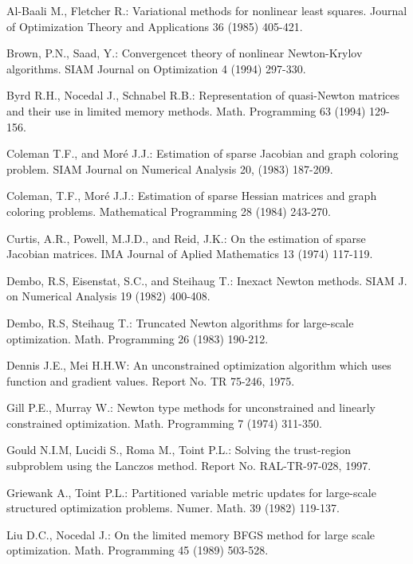 \documentclass{esub2acm}
\begin{document}
\small
\begin{thebibliography}{99}

Al-Baali M., Fletcher R.: Variational methods for nonlinear least
squares. Journal of Optimization Theory and Applications 36 (1985)
405-421.

Brown, P.N., Saad, Y.: Convergencet theory of nonlinear Newton-Krylov
algorithms. SIAM Journal on Optimization 4 (1994) 297-330.

Byrd R.H., Nocedal J., Schnabel R.B.: Representation of quasi-Newton
matrices and their use in limited memory methods. Math. Programming
63 (1994) 129-156.

Coleman T.F., and Mor\'{e} J.J.: Estimation of sparse Jacobian and
graph coloring problem.  SIAM Journal on Numerical Analysis 20,
(1983) 187-209.

Coleman, T.F., Mor\'{e} J.J.: Estimation
of sparse Hessian matrices and graph coloring problems. Mathematical
Programming 28 (1984) 243-270.

Curtis, A.R., Powell, M.J.D., and Reid, J.K.: On the estimation
of sparse Jacobian matrices. IMA Journal of Aplied Mathematics
13 (1974) 117-119.

Dembo, R.S, Eisenstat, S.C., and Steihaug T.: Inexact Newton methods.
SIAM J. on Numerical Analysis 19 (1982) 400-408.

Dembo, R.S, Steihaug T.: Truncated Newton algorithms for large-scale
optimization. Math. Programming 26 (1983) 190-212.

Dennis J.E., Mei H.H.W: An unconstrained optimization algorithm which
uses function and gradient values. Report No. TR 75-246, 1975.

Gill P.E., Murray W.: Newton type methods for
unconstrained and linearly constrained optimization.
Math. Programming 7 (1974) 311-350.

Gould N.I.M, Lucidi S., Roma M., Toint P.L.: Solving the trust-region
subproblem using the Lanczos method. Report No. RAL-TR-97-028, 1997.

Griewank A., Toint P.L.: Partitioned variable metric updates for large-scale
structured optimization problems. Numer. Math. 39 (1982) 119-137.

Liu D.C., Nocedal J.: On the limited memory BFGS method for large
scale optimization. Math. Programming 45 (1989) 503-528.


\end{thebibliography}
\end{document}
